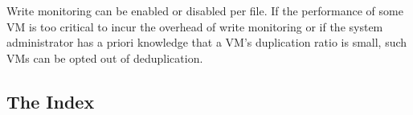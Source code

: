 Write monitoring can be enabled or disabled per file.
If the performance of some VM is too critical to incur the
overhead of write monitoring or if the system administrator has
a priori knowledge that a VM's duplication ratio is small, such VMs
can be opted out of deduplication.

\subsection{The Index}







